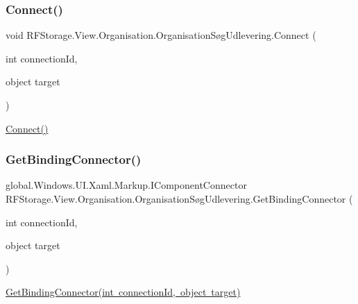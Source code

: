 \subsubsection{\texorpdfstring{Connect()}{Connect()}}
{\footnotesize\ttfamily void R\+F\+Storage.\+View.\+Organisation.\+Organisation\+Søg\+Udlevering.\+Connect (\begin{DoxyParamCaption}\item[{int}]{connection\+Id,  }\item[{object}]{target }\end{DoxyParamCaption})}



\mbox{\hyperlink{class_r_f_storage_1_1_view_1_1_organisation_1_1_organisation_s_xC3_xB8g_udlevering_a1c3f907dc8d2716b4247220b7edc800a}{Connect()}} 

\mbox{\label{class_r_f_storage_1_1_view_1_1_organisation_1_1_organisation_s_xC3_xB8g_udlevering_acb0661532f54c1d1e3bf3d284da45959}} 
\subsubsection{\texorpdfstring{GetBindingConnector()}{GetBindingConnector()}}
{\footnotesize\ttfamily global.\+Windows.\+U\+I.\+Xaml.\+Markup.\+I\+Component\+Connector R\+F\+Storage.\+View.\+Organisation.\+Organisation\+Søg\+Udlevering.\+Get\+Binding\+Connector (\begin{DoxyParamCaption}\item[{int}]{connection\+Id,  }\item[{object}]{target }\end{DoxyParamCaption})}



\mbox{\hyperlink{class_r_f_storage_1_1_view_1_1_organisation_1_1_organisation_s_xC3_xB8g_udlevering_acb0661532f54c1d1e3bf3d284da45959}{Get\+Binding\+Connector(int connection\+Id, object target)}} 

\mbox{\label{class_r_f_storage_1_1_view_1_1_organisation_1_1_organisation_s_xC3_xB8g_udlevering_aaa5ca0ca81611f8a538b954a449382cf}} 

